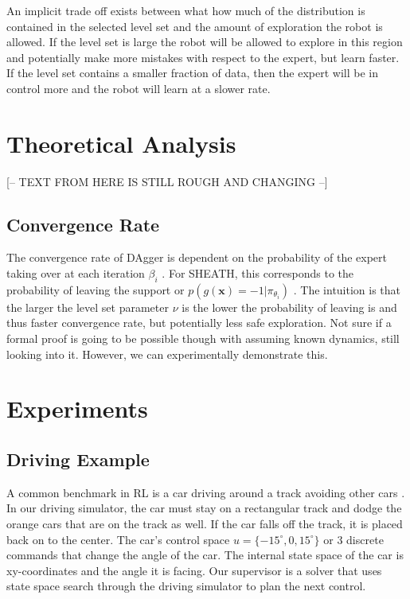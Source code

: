 \documentclass[10pt, conference]{ieeeconf}      %
\begin{document}
An implicit trade off exists between what how much of the distribution is contained in the selected level set and the amount of exploration the robot is allowed. If the level set is large the robot will be allowed to explore in this region and potentially make more mistakes with respect to the expert, but learn faster. If the level set contains a smaller fraction of data, then the expert will be in control more and the robot will learn at a slower rate. 


\section{Theoretical Analysis}
{\color{blue} [-- TEXT FROM HERE IS STILL ROUGH AND CHANGING --]}
\subsection{Convergence Rate}
The convergence rate of DAgger is dependent on the probability of the expert taking over at each iteration $\beta_i$ \cite{ross2010reduction}. For SHEATH, this corresponds to the probability of leaving the support or $p(g(\mathbf{x}) = -1|\pi_{\theta_i})$ . The intuition is that the larger the level set parameter $\nu$ is the lower the probability of leaving is and thus faster convergence rate, but potentially less safe exploration. Not sure if a formal proof is going to be possible though with assuming known dynamics, still looking into it. However, we can experimentally demonstrate this. 




\section{Experiments}
\subsection{Driving Example}
A common benchmark in RL is a car driving around a track avoiding other cars \cite{argall2009survey}. In our driving simulator, the car must stay on a rectangular track and dodge the orange cars that are on the track as well. If the car falls off the track, it is placed back on to the center. The car's control space $u = \lbrace -15^\circ, 0, 15^\circ \rbrace$ or 3 discrete commands that change the angle of the car. The internal state space of the car is xy-coordinates and the angle it is facing. Our supervisor is a solver that uses state space search through the driving simulator to plan the next control.
\end{document}

